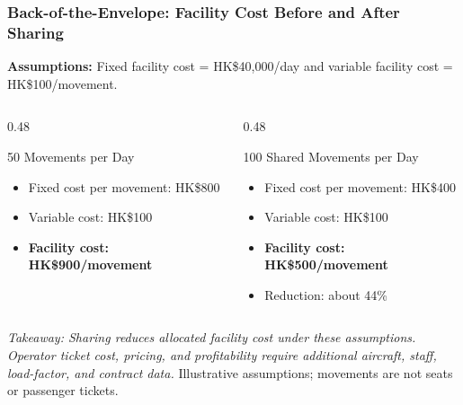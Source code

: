 \documentclass{beamer}
\begin{document}
\begin{frame}[t,shrink=11]
\frametitle{Back-of-the-Envelope: Facility Cost Before and After Sharing}
\textbf{Assumptions:} Fixed facility cost = HK\$40,000/day and variable facility cost = HK\$100/movement.
\begin{columns}[T]
\begin{column}{0.48\textwidth}\begin{block}{50 Movements per Day}
\begin{itemize}
\item Fixed cost per movement: HK\$800
\item Variable cost: HK\$100
\item \textbf{Facility cost: HK\$900/movement}
\end{itemize}\end{block}\end{column}
\begin{column}{0.48\textwidth}\begin{block}{100 Shared Movements per Day}
\begin{itemize}
\item Fixed cost per movement: HK\$400
\item Variable cost: HK\$100
\item \textbf{Facility cost: HK\$500/movement}
\item Reduction: about 44\%
\end{itemize}\end{block}\end{column}
\end{columns}
\textit{Takeaway: Sharing reduces allocated facility cost under these assumptions. Operator ticket cost, pricing, and profitability require additional aircraft, staff, load-factor, and contract data.}
\vfill{\tiny Illustrative assumptions; movements are not seats or passenger tickets.}
\end{frame}
\end{document}
